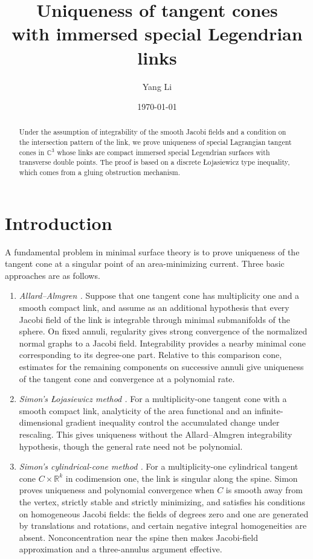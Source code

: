 \documentclass[11pt,a4paper]{article}
\title{Uniqueness of tangent cones\\with immersed special Legendrian links}
\author{Yang Li}
\date{\today}
\numberwithin{equation}{section}
\theoremstyle{definition}
\theoremstyle{remark}
\newcommand{\R}{\mathbb R}
\newcommand{\C}{\mathbb C}
\begin{document}
	\maketitle
	
	\begin{abstract}
		Under the assumption of integrability of the smooth Jacobi fields
		and a condition on the intersection pattern of the link, we prove uniqueness of
		special Lagrangian tangent cones in $\C^3$ whose links are compact
		immersed special Legendrian surfaces with transverse double points.
		The proof is based on a discrete \L{}ojasiewicz type inequality, which
		comes from a gluing obstruction mechanism.
	\end{abstract}
	
	\tableofcontents
	
	\section{Introduction}\label{sect:introduction}
	
	A fundamental problem in minimal surface theory is to prove uniqueness
	of the tangent cone at a singular point of an area-minimizing current.
	Three basic approaches are as follows.
	\begin{enumerate}
		\item \emph{Allard--Almgren \cite{AllardAlmgren}.}
		Suppose that one tangent cone has multiplicity one and a smooth compact
		link, and assume as an additional hypothesis that every Jacobi field of
		the link is integrable through minimal submanifolds of the sphere.
		On fixed annuli, regularity gives strong convergence of the normalized
		normal graphs to a Jacobi field. Integrability provides a nearby minimal
		cone corresponding to its degree-one part. Relative to this comparison
		cone, estimates for the remaining components on successive annuli give
		uniqueness of the tangent cone and convergence at a polynomial rate.
		
		\item \emph{Simon's \L{}ojasiewicz method \cite{Simon83}.}
		For a multiplicity-one tangent cone with a smooth compact link, analyticity
		of the area functional and an infinite-dimensional gradient inequality
		control the accumulated change under rescaling. This gives uniqueness
		without the Allard--Almgren integrability hypothesis, though the general
		rate need not be polynomial.
		
		\item \emph{Simon's cylindrical-cone method \cite{Simon93,Simon94}.}
		For a multiplicity-one cylindrical tangent cone $C\times\R^k$ in
		codimension one, the link is singular along the spine. Simon proves
		uniqueness and polynomial convergence when $C$ is smooth away from the
		vertex, strictly stable and strictly minimizing, and satisfies his
		conditions on homogeneous Jacobi fields: the fields of degrees zero and one
		are generated by translations and rotations, and certain negative
		integral homogeneities are absent. Nonconcentration near the spine then
		makes Jacobi-field approximation and a three-annulus argument effective.
	\end{enumerate}
	
\end{document}

